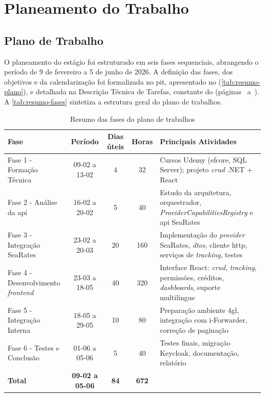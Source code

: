 ﻿%
\chapter{Planeamento do Trabalho}\label{chap:planeamento}

\section{Plano de Trabalho}

O planeamento do estágio foi estruturado em seis fases sequenciais, abrangendo o período de 9 de fevereiro a 5 de junho de 2026. A definição das fases, dos objetivos e da calendarização foi formalizada no \gls{pit}, apresentado no  (\autoref{tab:resumo-plano}), e detalhada na Descrição Técnica de Tarefas, constante do  (páginas~\pageref{fig:tarefas-pag1} a~\pageref{fig:tarefas-pag5}). A \autoref{tab:resumo-fases} sintetiza a estrutura geral do plano de trabalhos.

\begin{table}[H]
\centering
\caption{Resumo das fases do plano de trabalhos}
\label{tab:resumo-fases}
\small
\begin{tabular}{|p{}|c|c|c|p{}|}
\hline
\textbf{Fase} & \textbf{Período} & \textbf{Dias úteis} & \textbf{Horas} & \textbf{Principais Atividades} \\
\hline
Fase 1 - Formação Técnica & 09-02 a 13-02 & 4 & 32 & Cursos Udemy (\gls{efcore}, SQL Server); projeto \textit{\gls{crud}} .NET + React \\
\hline
Fase 2 - Análise da \gls{api} & 16-02 a 20-02 & 5 & 40 & Estudo da arquitetura, orquestrador, \textit{ProviderCapabilitiesRegistry} e \gls{api} SeaRates \\
\hline
Fase 3 - Integração SeaRates & 23-02 a 20-03 & 20 & 160 & Implementação do \textit{provider} SeaRates, \textit{\glspl{dto}}, cliente \gls{http}, serviços de \textit{tracking}, testes \\
\hline
Fase 4 - Desenvolvimento \textit{frontend} & 23-03 a 18-05 & 40 & 320 & Interface React: \textit{\gls{crud}}, \textit{tracking}, permissões, créditos, \textit{dashboards}, suporte multilingue \\
\hline
Fase 5 - Integração Interna & 18-05 a 29-05 & 10 & 80 & Preparação ambiente \gls{4gl}, integração com i-Forwarder, correção de paginação \\
\hline
Fase 6 - Testes e Conclusão & 01-06 a 05-06 & 5 & 40 & Testes finais, migração Keycloak, documentação, relatório \\
\hline
\textbf{Total} & \textbf{09-02 a 05-06} & \textbf{84} & \textbf{672} & \\
\hline
\end{tabular}
\end{table}

